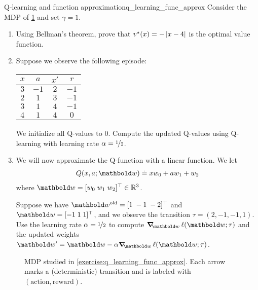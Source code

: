 \excheading

\begin{nexercise}{Q-learning and function approximation}{q_learning_func_approx}
  Consider the MDP of \cref{fig:q_learning_func_approx} and set $\gamma = 1$.

  \begin{enumerate}
    \item Using Bellman's theorem, prove that $\v*{x} = -\abs{x-4}$ is the optimal value function.

    \item Suppose we observe the following episode:
    \begin{center}
      \vspace{5pt}
      \begin{tabular}{cccc}
        \toprule
        $x$ & $a$ & $x'$ & $r$ \\
        \midrule
        $3$ & $-1$ & $2$ & $-1$ \\
        $2$ & $1$ & $3$ & $-1$ \\
        $3$ & $1$ & $4$ & $-1$ \\
        $4$ & $1$ & $4$ & $0$ \\
        \bottomrule
      \end{tabular}
      \vspace{5pt}
    \end{center}
    We initialize all Q-values to $0$.
    Compute the updated Q-values using Q-learning with learning rate $\alpha = \nicefrac{1}{2}$.

    \item We will now approximate the Q-function with a linear function.
    We let \begin{align*}
      \Q{x}{a; \vw} \defeq x w_0 + a w_1 + w_2
    \end{align*} where $\vw = \transpose{[w_0 \; w_1 \; w_2]} \in \R^3$.

    Suppose we have $\old{\vw} = \transpose{[1 \; -1 \; -2]}$ and $\vw = \transpose{[-1 \; 1 \; 1]}$, and we observe the transition $\tau = (2, -1, -1, 1)$.
    Use the learning rate $\alpha = \nicefrac{1}{2}$ to compute $\grad_\vw \ell(\vw; \tau)$ and the updated weights ${\vw' = \vw - \alpha \grad_\vw \ell(\vw; \tau)}$.
  \end{enumerate}
\end{nexercise}

\begin{figure}
  \caption{MDP studied in \cref{exercise:q_learning_func_approx}. Each arrow marks a (deterministic) transition and is labeled with $(\text{action},\text{reward})$.}\label{fig:q_learning_func_approx}
\end{figure}

